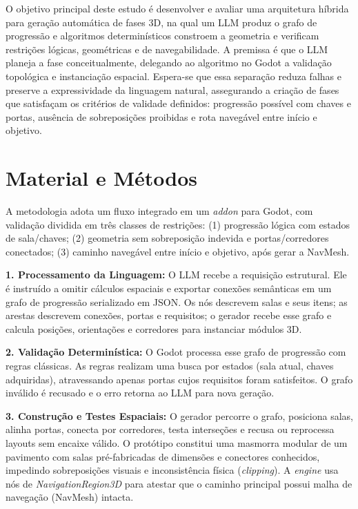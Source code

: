 \documentclass[
  12pt,
  a4paper,
  oneside,
  article,
  brazil
]{abntex2}
\begin{document}
O objetivo principal deste estudo é desenvolver e avaliar uma arquitetura híbrida para geração automática de fases 3D, na qual um LLM produz o grafo de progressão e algoritmos determinísticos constroem a geometria e verificam restrições lógicas, geométricas e de navegabilidade. A premissa é que o LLM planeja a fase conceitualmente, delegando ao algoritmo no Godot a validação topológica e instanciação espacial. Espera-se que essa separação reduza falhas e preserve a expressividade da linguagem natural, assegurando a criação de fases que satisfaçam os critérios de validade definidos: progressão possível com chaves e portas, ausência de sobreposições proibidas e rota navegável entre início e objetivo.

\section{Material e Métodos}

A metodologia adota um fluxo integrado em um \textit{addon} para Godot, com validação dividida em três classes de restrições: (1) progressão lógica com estados de sala/chaves; (2) geometria sem sobreposição indevida e portas/corredores conectados; (3) caminho navegável entre início e objetivo, após gerar a NavMesh.

\textbf{1. Processamento da Linguagem:} O LLM recebe a requisição estrutural. Ele é instruído a omitir cálculos espaciais e exportar conexões semânticas em um grafo de progressão serializado em JSON. Os nós descrevem salas e seus itens; as arestas descrevem conexões, portas e requisitos; o gerador recebe esse grafo e calcula posições, orientações e corredores para instanciar módulos 3D.

\textbf{2. Validação Determinística:} O Godot processa esse grafo de progressão com regras clássicas. As regras realizam uma busca por estados (sala atual, chaves adquiridas), atravessando apenas portas cujos requisitos foram satisfeitos. O grafo inválido é recusado e o erro retorna ao LLM para nova geração.

\textbf{3. Construção e Testes Espaciais:} O gerador percorre o grafo, posiciona salas, alinha portas, conecta por corredores, testa interseções e recusa ou reprocessa layouts sem encaixe válido. O protótipo constitui uma masmorra modular de um pavimento com salas pré-fabricadas de dimensões e conectores conhecidos, impedindo sobreposições visuais e inconsistência física (\textit{clipping}). A \textit{engine} usa nós de \textit{NavigationRegion3D} para atestar que o caminho principal possui malha de navegação (NavMesh) intacta.
\end{document}
